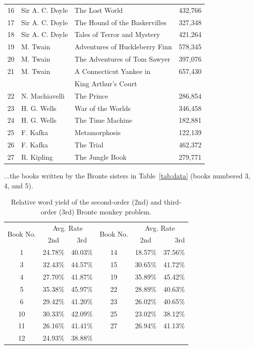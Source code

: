 \documentclass[conference]{IEEEtran}
\newcommand{\codefile}[1]{
  \begin{framed}
  \fontsize{5.65}{6.78}\selectfont
  
  \end{framed}
}
\begin{document}
\begin{table}
\begin{center}
\begin{tabular}{r@{\hspace{1.1em}}l@{\hspace{1.1em}}l@{\hspace{0.75em}}r}
16 & Sir A. C. Doyle & The Lost World & 432,766 \\
17 & Sir A. C. Doyle & The Hound of the Baskervilles & 327,348 \\
18 & Sir A. C. Doyle & Tales of Terror and Mystery & 421,264 \\
19 & M. Twain & Adventures of Huckleberry Finn & 578,345 \\
20 & M. Twain & The Adventures of Tom Sawyer & 397,076 \\
21 & M. Twain & A Connecticut Yankee in & 657,430 \\
   &          & King Arthur's Court & \\
22 & N. Machiavelli & The Prince & 286,854 \\
23 & H. G. Wells & War of the Worlds & 346,458 \\
24 & H. G. Wells & The Time Machine & 182,881 \\
25 & F. Kafka & Metamorphosis & 122,139 \\
26 & F. Kafka & The Trial & 462,372 \\
27 & R. Kipling & The Jungle Book & 279,771 \\
\hline
\end{tabular}
\end{center}
\end{table}

...the books written by the Bronte sisters in Table~\ref{tab:data}
(books numbered 3, 4, and 5).

\codefile{problem1c.py}

\begin{table}
\caption{Relative word yield of the second-order (2nd) and 
third-order (3rd) Bronte monkey problem.\label{tab:problem1c}}
\vspace{-10pt}
\begin{center}

\begin{tabular}{cccccr}
\hline 
\multirow{2}{*}{Book No.} & \multicolumn{2}{c}{Avg. Rate} & \multirow{2}{*}{Book No.} & \multicolumn{2}{c}{Avg. Rate} \\
\cline{2-3} \cline{5-6} 
 & 2nd & 3rd &  & 2nd & 3rd\hspace{0.75em} \\
\hline
1  & 24.78\% & 40.03\% & 14 & 18.57\% & 37.56\% \\
3  & 32.43\% & 44.57\% & 15 & 30.65\% & 41.72\% \\
4  & 27.70\% & 41.87\% & 19 & 35.89\% & 45.42\% \\
5  & 35.38\% & 45.97\% & 22 & 28.89\% & 40.63\% \\
6  & 29.42\% & 41.20\% & 23 & 26.02\% & 40.65\% \\
10 & 30.33\% & 42.09\% & 25 & 23.02\% & 38.12\% \\
11 & 26.16\% & 41.41\% & 27 & 26.94\% & 41.13\% \\
12 & 24.93\% & 38.88\% &    &    & \\
\hline
\end{tabular}
\end{center}
\end{table}
\end{document}

